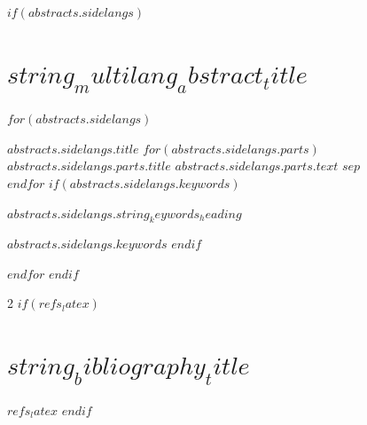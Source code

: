 \documentclass[twoside]{jchs}
\begin{document}

$if(abstracts.sidelangs)$
\section{$string_multilang_abstract_title$}
\vspace{2mm}
$for(abstracts.sidelangs)$
\begin{tcolorbox}[colframe=themecolor2, colback=themecolor2, sharp corners,boxsep=4mm,top=3.5mm,left=3.8mm,right=2.0mm,bottom=1mm,breakable]\sffamily
	{\fontsize{11}{14}\selectfont \bfseries $abstracts.sidelangs.title$}
	\vskip 1mm
	$for(abstracts.sidelangs.parts)$
        	{\bfseries $abstracts.sidelangs.parts.title$} $abstracts.sidelangs.parts.text$ $sep$\\
    $endfor$
$if(abstracts.sidelangs.keywords)$\vskip 3mm{\raggedright\bfseries $abstracts.sidelangs.string_keywords_heading$}  $abstracts.sidelangs.keywords$ $endif$
\end{tcolorbox}
\vspace{3mm}
$endfor$
$endif$

\begin{multicols}{2}
	\raggedcolumns
	$if(refs_latex)$
	\section{$string_bibliography_title$}
\raggedcolumns
	\hypersetup{colorlinks=false,hidelinks=true}
	$refs_latex$
	$endif$
\end{multicols}
\end{document}
